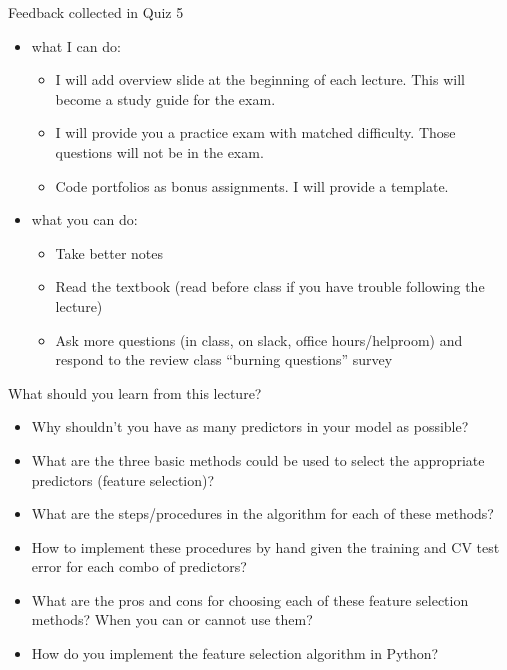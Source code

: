 \documentclass[aspectratio=169,usenames,dvipsnames]{beamer}
\begin{document}
\begin{frame}[t]{Feedback collected in Quiz 5}
	\begin{itemize}
		\item what I can do:
		\begin{itemize}
			\item I will add overview slide at the beginning of each lecture. This will become a study guide for the exam.  
			\item I will provide you a practice exam with matched difficulty. Those questions will not be in the exam.
			\item Code portfolios as bonus assignments. I will provide a template. 
		\end{itemize}
		\item what you can do:
		\begin{itemize}
			\item Take better notes
			\item Read the textbook (read before class if you have trouble following the lecture)
			\item Ask more questions (in class, on slack, office hours/helproom) and respond to the review class ``burning questions'' survey
		\end{itemize}
	\end{itemize}
\end{frame}

\begin{frame}[t]{What should you learn from this lecture?}
	\begin{itemize}
		\item Why shouldn't you have as many predictors in your model as possible? 
		\item What are the three basic methods could be used to select the appropriate predictors (feature selection)? 
		\item What are the steps/procedures in the algorithm for each of these methods? 
		\item How to implement these procedures by hand given the training and CV test error for each combo of predictors? 
		\item What are the pros and cons for choosing each of these feature selection methods? When you can or cannot use them?
		\item How do you implement the feature selection algorithm in Python?
	\end{itemize}
\end{frame}
\end{document}
